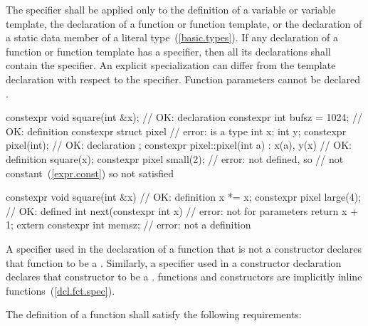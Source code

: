 \pnum
The  specifier shall be applied only to the definition of
a variable or variable template,
the declaration of a
function or function template, or the declaration of a static
data member of a literal type~(\ref{basic.types}).
If any declaration of a function or function template has
a  specifier,
then all its declarations shall contain the  specifier. \enternote An
explicit specialization can differ from the template declaration with respect to the
 specifier. \exitnote
\enternote
Function parameters cannot be declared .\exitnote
\enterexample
\begin{codeblock}
constexpr void square(int &x);  // OK: declaration
constexpr int bufsz = 1024;     // OK: definition
constexpr struct pixel {        // error:  is a type
  int x;
  int y;
  constexpr pixel(int);         // OK: declaration
}; 
constexpr pixel::pixel(int a)
  : x(a), y(x)                  // OK: definition
  { square(x); }
constexpr pixel small(2);       // error:  not defined, so 
                                // not constant~(\ref{expr.const}) so  not satisfied

constexpr void square(int &x) { // OK: definition
  x *= x;
}
constexpr pixel large(4);       // OK:  defined
int next(constexpr int x) {     // error: not for parameters
     return x + 1;
} 
extern constexpr int memsz;     // error: not a definition 
\end{codeblock}
\exitexample

\pnum
A  specifier used in the declaration of a function that is not a
constructor declares that
function to be a . Similarly, a
 specifier used in 
a constructor declaration declares that constructor to be a
.
 functions and  constructors are
implicitly inline functions~(\ref{dcl.fct.spec}).

\pnum
{}
The definition of a  function shall satisfy the following
requirements:

